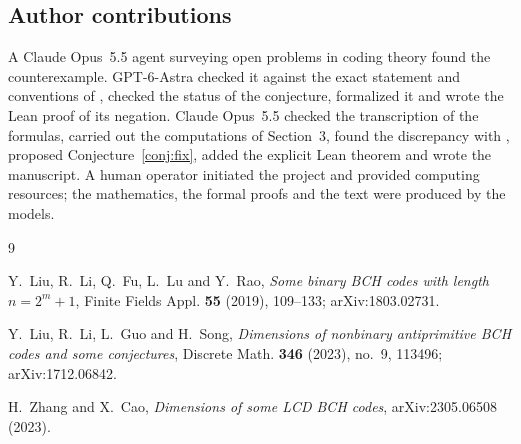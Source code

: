 \documentclass[11pt]{amsart}
\theoremstyle{remark}
\begin{document}
\subsection*{Author contributions}
A Claude Opus~5.5 agent surveying open problems in coding theory found the counterexample.
GPT-6-Astra checked it against the exact statement and conventions of \cite{LLGS}, checked the status of the conjecture, formalized it and wrote the Lean proof of its negation.
Claude Opus~5.5 checked the transcription of the formulas, carried out the computations of Section~3, found the discrepancy with \cite{LLFLR}, proposed Conjecture~\ref{conj:fix}, added the explicit Lean theorem and wrote the manuscript.
A human operator initiated the project and provided computing resources; the mathematics, the formal proofs and the text were produced by the models.

\begin{thebibliography}{9}

Y.~Liu, R.~Li, Q.~Fu, L.~Lu and Y.~Rao,
\emph{Some binary BCH codes with length $n=2^m+1$},
Finite Fields Appl. \textbf{55} (2019), 109--133; arXiv:1803.02731.

Y.~Liu, R.~Li, L.~Guo and H.~Song,
\emph{Dimensions of nonbinary antiprimitive BCH codes and some conjectures},
Discrete Math. \textbf{346} (2023), no.~9, 113496; arXiv:1712.06842.

H.~Zhang and X.~Cao,
\emph{Dimensions of some LCD BCH codes},
arXiv:2305.06508 (2023).

\end{thebibliography}
\end{document}
